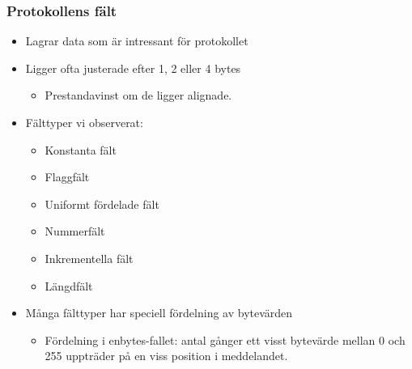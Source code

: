\documentclass[xetex, 8pt]{beamer}
\begin{document}
    \begin{frame}
        \frametitle{Protokollens fält}
        \begin{itemize}
            \item Lagrar data som är intressant för protokollet
            \item Ligger ofta justerade efter 1, 2 eller 4 bytes
                \begin{itemize}
                    \item Prestandavinst om de ligger alignade.
                \end{itemize}
            \item Fälttyper vi observerat:
                \begin{itemize}
                    \item Konstanta fält
                    \item Flaggfält
                    \item Uniformt fördelade fält
                    \item Nummerfält
                    \item Inkrementella fält
                    \item Längdfält
                \end{itemize}
            \item Många fälttyper har speciell fördelning av bytevärden
                \begin{itemize}
                    \item Fördelning i enbytes-fallet: antal gånger ett visst
                        bytevärde mellan 0 och 255 uppträder på en viss position
                        i meddelandet.
                \end{itemize}
        \end{itemize}
    \end{frame}

\end{document}
